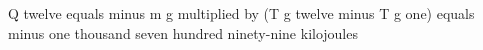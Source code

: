 Q twelve equals minus m g multiplied by (T g twelve minus T g one)  
equals minus one thousand seven hundred ninety-nine kilojoules